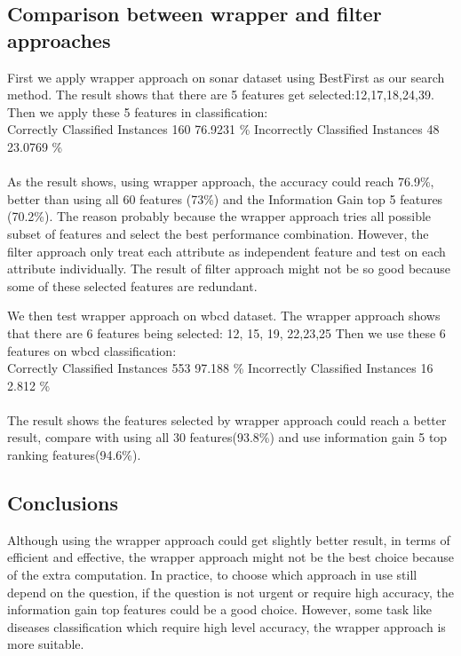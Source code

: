\documentclass[11pt, a4paper, oneside, openright]{article}
\begin{document}
\subsection{Comparison between wrapper and filter approaches}
First we apply wrapper approach on sonar dataset using BestFirst as our search method.
The result shows that there are 5 features get selected:12,17,18,24,39.
Then we apply these 5 features in classification:
\\
\newline Correctly Classified Instances     \hspace * {4mm}    160    \hspace * {4mm}           76.9231 \%
\newline Incorrectly Classified Instances   \hspace * {4mm}     48      \hspace * {4mm}         23.0769 \%
\\
\\
As the result shows, using wrapper approach, the accuracy could reach 76.9\%, better than using all 60 features (73\%)  and the Information Gain top 5 features (70.2\%). The reason probably because the wrapper approach tries all possible subset of features and select the best performance combination. However, the filter approach only treat each attribute as independent feature and test on each attribute individually. The result of filter approach might not be so good because some of these selected features are redundant. 


We then test wrapper approach on wbcd dataset.
 The wrapper approach shows that there are 6 features being selected: 12, 15, 19, 22,23,25
Then we use these 6 features on wbcd classification:
\\
\newline Correctly Classified Instances    \hspace * {4mm}     553    \hspace * {4mm}           97.188  \%
\newline Incorrectly Classified Instances  \hspace * {4mm}      16     \hspace * {4mm}           2.812  \%
\\
\\
The result shows the features selected by wrapper approach could reach a better result, compare with using all 30 features(93.8\%) and use information gain 5 top ranking features(94.6\%).

\subsection{Conclusions}
Although using the wrapper approach could get slightly better result, in terms of efficient and effective, the wrapper approach might not be the best choice because of the extra computation. In practice, to choose which approach in use still depend on the question, if the question is not urgent or require high accuracy, the information gain top features could be a good choice. However, some task like diseases classification which require high level accuracy, the wrapper approach is more suitable.
\backmatter

%


\end{document}
